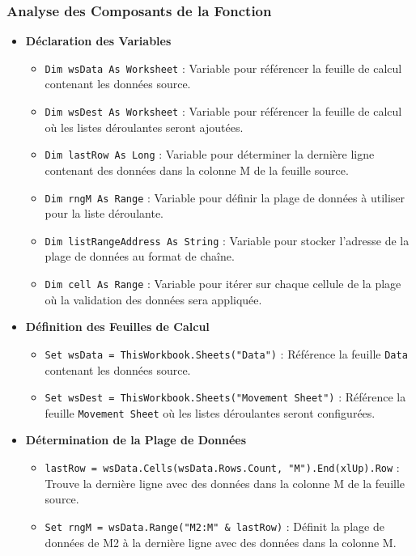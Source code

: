 \documentclass[a4paper, oneside, 12pt, final]{extreport}
\begin{document}
\subsubsection{Analyse des Composants de la Fonction}
\begin{itemize}
    \item \textbf{Déclaration des Variables}
    \begin{itemize}
        \item \texttt{Dim wsData As Worksheet} : Variable pour référencer la feuille de calcul contenant les données source.
        \item \texttt{Dim wsDest As Worksheet} : Variable pour référencer la feuille de calcul où les listes déroulantes seront ajoutées.
        \item \texttt{Dim lastRow As Long} : Variable pour déterminer la dernière ligne contenant des données dans la colonne M de la feuille source.
        \item \texttt{Dim rngM As Range} : Variable pour définir la plage de données à utiliser pour la liste déroulante.
        \item \texttt{Dim listRangeAddress As String} : Variable pour stocker l'adresse de la plage de données au format de chaîne.
        \item \texttt{Dim cell As Range} : Variable pour itérer sur chaque cellule de la plage où la validation des données sera appliquée.
    \end{itemize}
    \item \textbf{Définition des Feuilles de Calcul}
    \begin{itemize}
        \item \texttt{Set wsData = ThisWorkbook.Sheets("Data")} : Référence la feuille \texttt{Data} contenant les données source.
        \item \texttt{Set wsDest = ThisWorkbook.Sheets("Movement Sheet")} : Référence la feuille \texttt{Movement Sheet} où les listes déroulantes seront configurées.
    \end{itemize}
    \item \textbf{Détermination de la Plage de Données}
    \begin{itemize}
        \item \texttt{lastRow = wsData.Cells(wsData.Rows.Count, "M").End(xlUp).Row} : Trouve la dernière ligne avec des données dans la colonne M de la feuille source.
        \item \texttt{Set rngM = wsData.Range("M2:M" \& lastRow)} : Définit la plage de données de M2 à la dernière ligne avec des données dans la colonne M.

\end{itemize}
\end{itemize}
\end{document}
